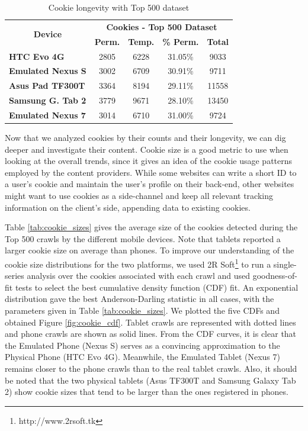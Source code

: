 \documentclass{acm_proc_article-sp}
\begin{document}
\begin{table}[h]
  \centering
  \caption{Cookie longevity with Top 500 dataset}
    \begin{tabular}{|c|c|c|c|c|}
    \hline
    \multicolumn{1}{|c|}{\multirow{2}[4]{*}{\textbf{Device}}} & \multicolumn{4}{|c|}{\textbf{Cookies - Top 500 Dataset}} \\ \cline{2-5}
    \multicolumn{1}{|c|}{} & \textbf{Perm.} & \textbf{Temp.} & \textbf{\% Perm.} & \textbf{Total} \\ \hline
    \multicolumn{1}{|l|}{\textbf{HTC Evo 4G}} & 2805  & 6228  & 31.05\% & 9033 \\
    \multicolumn{1}{|l|}{\textbf{Emulated Nexus S}} & 3002  & 6709  & 30.91\% & 9711 \\
    \multicolumn{1}{|l|}{\textbf{Asus Pad TF300T}} & 3364  & 8194  & 29.11\% & 11558 \\
    \multicolumn{1}{|l|}{\textbf{Samsung G. Tab 2}} & 3779  & 9671  & 28.10\% & 13450 \\
    \multicolumn{1}{|l|}{\textbf{Emulated Nexus 7}} & 3014  & 6710  & 31.00\% & 9724 \\ \hline
    \end{tabular}%
  \label{tab:cookie_longevity}%
\end{table}%

Now that we analyzed cookies by their counts and their longevity, we can dig deeper and investigate their content. Cookie size is a good metric to use when looking at the overall trends, since it gives an idea of the cookie usage patterns employed by the content providers. While some websites can write a short ID to a user's cookie and maintain the user's profile on their back-end, other websites might want to use cookies as a side-channel and keep all relevant tracking information on the client's side, appending data to existing cookies.

Table \ref{tab:cookie_sizes} gives the average size of the cookies detected during the Top 500 crawls by the different mobile devices. Note that tablets reported a larger cookie size on average than phones. To improve our understanding of the cookie size distributions for the two platforms, we used 2R Soft\footnote{http://www.2rsoft.tk} to run a single-series analysis over the cookies associated with each crawl and used goodness-of-fit tests to select the best cumulative density function (CDF) fit. An exponential distribution gave the best Anderson-Darling statistic in all cases, with the parameters given in Table \ref{tab:cookie_sizes}. We plotted the five CDFs and obtained Figure \ref{fig:cookie_cdf}. Tablet crawls are represented with dotted lines and phone crawls are shown as solid lines. From the CDF curves, it is clear that the Emulated Phone (Nexus S) serves as a convincing approximation to the Physical Phone (HTC Evo 4G). Meanwhile, the Emulated Tablet (Nexus 7) remains closer to the phone crawls than to the real tablet crawls. Also, it should be noted that the two physical tablets (Asus TF300T and Samsung Galaxy Tab 2) show cookie sizes that tend to be larger than the ones registered in phones.
\end{document}
